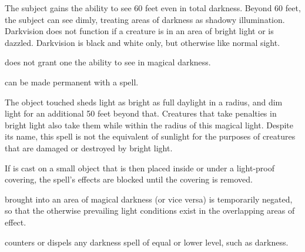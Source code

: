\spellrng{\rngtouch}
\spelldur{\durlong}
\begin{spelleffect}
  The subject gains the ability to see 60 feet even in total darkness. Beyond 60 feet, the subject can see dimly, treating areas of darkness as shadowy illumination. Darkvision does not function if a creature is in an area of bright light or is dazzled. Darkvision is black and white only, but otherwise like normal sight.
\end{spelleffect}
\begin{spellnotes}
   does not grant one the ability to see in magical darkness.

  \par {} can be made permanent with a  spell.
\end{spellnotes}

\spellrng{\rngtouch}
\begin{spelleffect}
  The object touched sheds light as bright as full daylight in a \arealarge radius, and dim light for an additional 50 feet beyond that. Creatures that take penalties in bright light also take them while within the radius of this magical light. Despite its name, this spell is not the equivalent of sunlight for the purposes of creatures that are damaged or destroyed by bright light.
  \par If  is cast on a small object that is then placed inside or under a light-proof covering, the spell's effects are blocked until the covering is removed.
\end{spelleffect}
\begin{spellnotes}
   brought into an area of magical darkness (or vice versa) is temporarily negated, so that the otherwise prevailing light conditions exist in the overlapping areas of effect.
  \par {} counters or dispels any darkness spell of equal or lower level, such as darkness.
\end{spellnotes}

